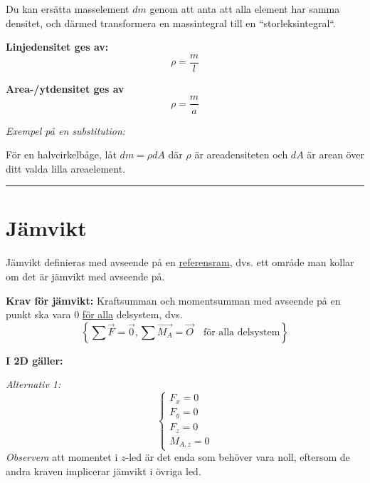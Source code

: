 \documentclass{article}
\newenvironment{ankiflashcard}[1][ ]{}{}
\newcommand{\ruler}{
\rule{0.5\textwidth}{0.5pt}
}
\begin{document}
\begin{paracol}{2}
Du kan ersätta masselement $dm$ genom att anta att alla element har samma densitet, och därmed transformera en massintegral till en ``storleksintegral``.


\begin{ankiflashcard}

\textbf{Linjedensitet ges av:}
$$
\rho = \frac{m}{l}
$$
\end{ankiflashcard}


\begin{ankiflashcard}
    
\textbf{Area-/ytdensitet ges av}
$$
\rho = \frac{m}{a}
$$

\textit{Exempel på en substitution:}

För en halvcirkelbåge, låt $dm=\rho dA$ där $\rho$ är areadensiteten och $dA$ är arean över ditt valda lilla areaelement.
\end{ankiflashcard}

\ruler
\section{Jämvikt}
Jämvikt definieras med avseende på en \underline{referensram}, dvs. ett område man kollar om det är jämvikt med avseende på.

\begin{ankiflashcard}
    
\textbf{Krav för jämvikt:} Kraftsumman och momentsumman med avseende på en punkt ska vara $0$ \underline{för alla} delsystem, dvs.
$$
\left\lbrace \sum \vec F = \vec 0, \sum \vec {M_A} = \vec O \quad \text{för alla delsystem}\right\rbrace
$$
\end{ankiflashcard}

\textbf{I 2D gäller:}

\begin{ankiflashcard}
    
\textit{Alternativ 1:}
$$
\begin{cases}
    F_x = 0\\
    F_y = 0\\
    F_z = 0\\
    M_{A,z} = 0
\end{cases}
$$
\textit{Observera} att momentet i $z$-led är det enda som behöver vara noll, eftersom de andra kraven implicerar jämvikt i övriga led.



\end{ankiflashcard}
\end{paracol}
\end{document}
